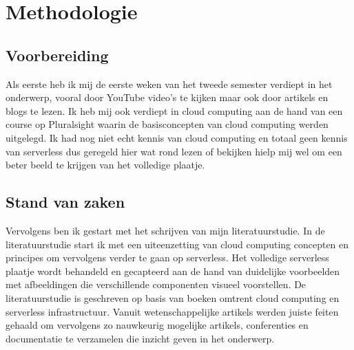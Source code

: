 
\chapter{Methodologie}
\label{ch:methodologie}


\section{Voorbereiding}
Als eerste heb ik mij de eerste weken van het tweede semester verdiept in het onderwerp, vooral door YouTube video's te kijken maar ook door artikels en blogs te lezen. Ik heb mij ook  verdiept in cloud computing aan de hand van een course op Pluralsight waarin de basisconcepten van cloud computing werden uitgelegd. Ik had nog niet echt kennis van cloud computing en totaal geen kennis van serverless dus geregeld hier wat rond lezen of bekijken hielp mij wel om een beter beeld te krijgen van het volledige plaatje. 

\section{Stand van zaken}
Vervolgens ben ik gestart met het schrijven van mijn literatuurstudie. In de literatuurstudie start ik met een uiteenzetting van cloud computing concepten en principes om vervolgens verder te gaan op serverless. Het volledige serverless plaatje wordt behandeld en gecapteerd aan de hand van duidelijke voorbeelden met afbeeldingen die verschillende componenten visueel voorstellen. De literatuurstudie is geschreven op basis van boeken omtrent cloud computing en serverless infrastructuur. Vanuit wetenschappelijke artikels werden juiste feiten gehaald om vervolgens zo nauwkeurig mogelijke artikels, conferenties en documentatie te verzamelen die inzicht geven in het onderwerp.

